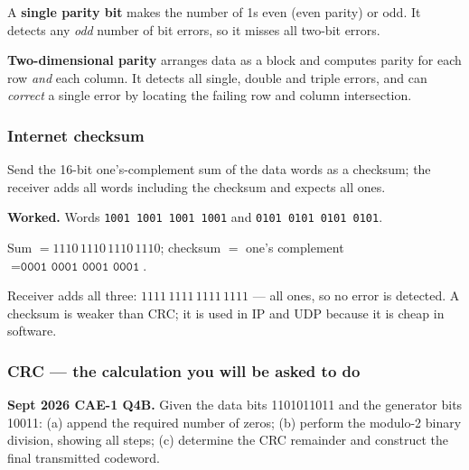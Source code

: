 \documentclass[11pt,a4paper]{article}
\begin{document}
A \textbf{single parity bit} makes the number of 1s even (even parity) or odd. It detects any \emph{odd} number of bit errors, so it misses all two-bit errors.

\textbf{Two-dimensional parity} arranges data as a block and computes parity for each row \emph{and} each column. It detects all single, double and triple errors, and can \emph{correct} a single error by locating the failing row and column intersection.

\subsubsection{Internet checksum}

Send the 16-bit one's-complement sum of the data words as a checksum; the receiver adds all words including the checksum and expects all ones.

\begin{exambox}
\textbf{Worked.} Words \texttt{1001 1001 1001 1001} and \texttt{0101 0101 0101 0101}.

Sum $= 1110\,1110\,1110\,1110$; checksum $=$ one's complement $= \texttt{0001 0001 0001 0001}$.

Receiver adds all three: $1111\,1111\,1111\,1111$ --- all ones, so no error is detected. A checksum is weaker than CRC; it is used in IP and UDP because it is cheap in software.
\end{exambox}

\subsubsection{CRC --- the calculation you will be asked to do}

\begin{pyqbox}
\textbf{Sept 2026 CAE-1 Q4B.} Given the data bits 1101011011 and the generator bits 10011: (a) append the required number of zeros; (b) perform the modulo-2 binary division, showing all steps; (c) determine the CRC remainder and construct the final transmitted codeword.
\end{pyqbox}
\end{document}
